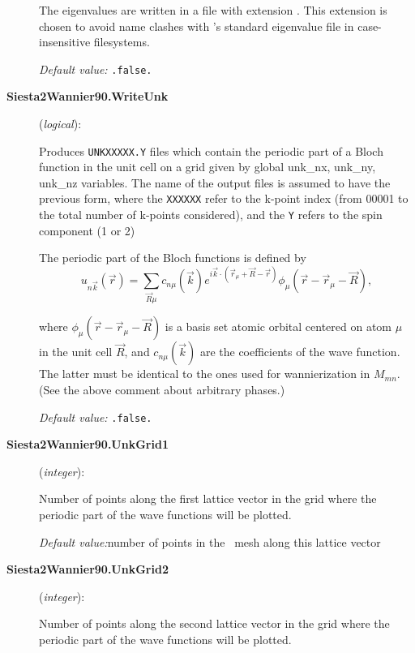 \begin{description}
The eigenvalues are written in a file with extension .
This extension is chosen to avoid name clashes
with \siesta's standard eigenvalue file in case-insensitive filesystems.

\textit{Default value:} \texttt{.false.}

\item[\textbf{Siesta2Wannier90.WriteUnk}] (\textit{logical}):

 Produces \texttt{UNKXXXXX.Y} files which contain the periodic part of a
 Bloch function in the unit cell on a grid given by global unk\_nx,
 unk\_ny, unk\_nz variables.  The name of the output files is assumed
 to have the previous form, where the \texttt{XXXXXX} refer to the k-point
 index (from 00001 to the total number of k-points considered), and
 the \texttt{Y} refers to the spin component (1 or 2)

 The periodic part of the Bloch functions is defined by
 \begin{equation}
   u_{n \vec{k}} (\vec{r}) =
   \sum_{\vec{R} \mu} c_{n \mu}(\vec{k})
        e^{i \vec{k} \cdot ( \vec{r}_{\mu} + \vec{R} - \vec{r} )}
        \phi_{\mu} (\vec{r} - \vec{r}_{\mu} - \vec{R} ) ,
\end{equation}

\noindent where $\phi_{\mu} (\vec{r} - \vec{r}_{\mu} - \vec{R} )$
 is a basis set atomic orbital centered on atom $\mu$ in
 the unit cell $\vec{R}$, and $c_{n \mu}(\vec{k})$ are the coefficients
 of the wave function. The latter must be identical to the ones used
 for wannierization in $M_{mn}$. (See the above comment about
 arbitrary phases.)

\textit{Default value:} \texttt{.false.}

\item[\textbf{Siesta2Wannier90.UnkGrid1}] (\textit{integer}):

Number of points along the first lattice vector in the grid where
the periodic part of the wave functions will be plotted.

\textit{Default value:}{number of points in the \siesta\ mesh along this lattice vector}

\item[\textbf{Siesta2Wannier90.UnkGrid2}] (\textit{integer}):

Number of points along the second lattice vector in the grid where
the periodic part of the wave functions will be plotted.


\end{description}

